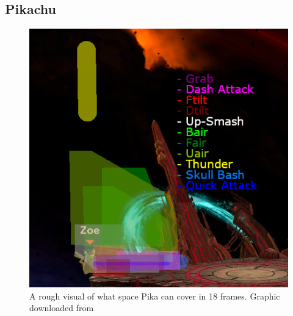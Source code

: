 \subsection{Pikachu}

\begin{figure}[h]
    \centering
    \includegraphics[width=.4\textwidth]{images/threat-ranges/pika}
    \caption{A rough visual of what space Pika can cover in 18 frames. Graphic downloaded from\cite{ref:zovrah:threat-range:pika}}
\end{figure}

